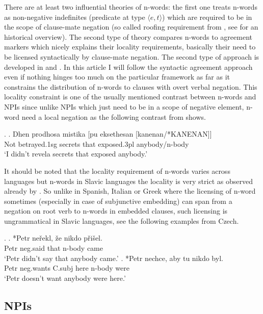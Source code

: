 \documentclass[12pt]{scrartcl}
\begin{document}
There are at least two influential theories of n-words: the first one treats n-words as non-negative indefinites (predicate at type \(\langle e,t\rangle\)) which are required to be in the scope of clause-mate negation (so called roofing requirement from \cite{ladusaw1992expressing}, see \cite{giannakidou1997landscape} for an historical overview). The second type of theory compares n-words to agreement markers which nicely explains their locality requirements, basically their need to be licensed syntactically by clause-mate negation. The second type of approach is developed in  \cite{zeijlstra2004sentential} and \cite{zeijlstra2008negative}. In this article I will follow the syntactic agreement approach even if nothing hinges too much on the particular framework as far as it constrains the distribution of n-words to clauses with overt verbal negation. This locality constraint is one of the usually mentioned contrast between n-words and NPIs since unlike  NPIs which just need to be in a scope of negative element, n-word need a local negation as the following contrast from \cite{giannakidou2017landscape} shows.


\ex. \ag. Dhen prodhosa mistika {[}pu eksethesan
{[}kanenan/*KANENAN{]}{]}\\
Not betrayed.1sg secrets that exposed.3pl anybody/n-body\\
`I didn't revela secrets that exposed anybody.'

It should be noted that the locality requirement of n-words varies across languages but n-words in Slavic languages the  locality is very strict  as observed already by \cite{progovac1993negative}. So unlike in Spanish, Italian or Greek where the licensing of n-word sometimes (especially in case of subjunctive embedding) can span from a negation on root verb to n-words in embedded clauses, such licensing is ungrammatical in Slavic languages, see the following examples from Czech.

\ex. \ag. *Petr neřekl, že nikdo přišel.\\
Petr neg.said that n-body came\\
`Petr didn't say that anybody came.' \bg. *Petr nechce, aby tu nikdo
byl.\\
Petr neg.wants C.subj here n-body were\\
`Petr doesn't want anybody were here.'


\hypertarget{npis}{%
\subsection{NPIs}\label{npis}}
\end{document}
